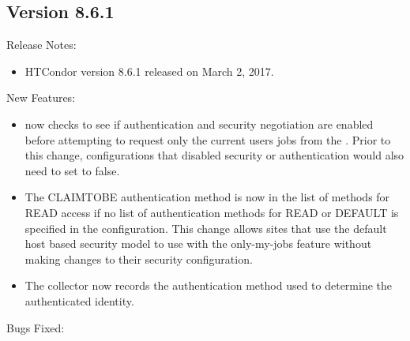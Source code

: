 \subsection*{\label{sec:New-8-6-1}Version 8.6.1}

\noindent Release Notes:

\begin{itemize}

\item HTCondor version 8.6.1 released on March 2, 2017.

\end{itemize}


\noindent New Features:

\begin{itemize}

\item {} now checks to see if authentication and security negotiation are enabled before attempting to
request only the current users jobs from the .  Prior to this change, configurations that disabled
security or authentication would also need to set  to false.

\item The CLAIMTOBE authentication method is now in the list of methods for READ access if no list of
authentication methods for READ or DEFAULT is specified in the configuration.  This change allows sites that
use the default host based security model to use   with the only-my-jobs feature
without making changes to their security configuration.

\item The collector now records the authentication method used to determine the authenticated identity.

\end{itemize}

\noindent Bugs Fixed:

